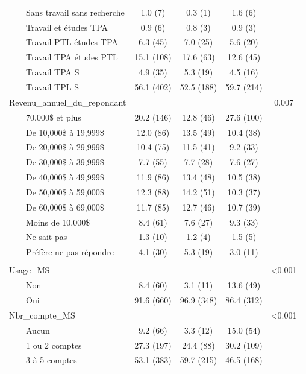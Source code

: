 \documentclass[
]{article}
\begin{document}
\begin{table}[!t]
\begin{tabular*}{\linewidth}{@{\extracolsep{\fill}}lcccc}
    Sans travail sans recherche & 1.0   (7) & 0.3   (1) & 1.6   (6) &  \\ 
    Travail et études TPA & 0.9   (6) & 0.8   (3) & 0.9   (3) &  \\ 
    Travail PTL études TPA & 6.3   (45) & 7.0   (25) & 5.6   (20) &  \\ 
    Travail TPA études PTL & 15.1   (108) & 17.6   (63) & 12.6   (45) &  \\ 
    Travail TPA S & 4.9   (35) & 5.3   (19) & 4.5   (16) &  \\ 
    Travail TPL S & 56.1   (402) & 52.5   (188) & 59.7   (214) &  \\ 
Revenu\_annuel\_du\_repondant &  &  &  & 0.007 \\ 
    70,000\$ et plus & 20.2   (146) & 12.8   (46) & 27.6   (100) &  \\ 
    De 10,000\$ à 19,999\$ & 12.0   (86) & 13.5   (49) & 10.4   (38) &  \\ 
    De 20,000\$ à 29,999\$ & 10.4   (75) & 11.5   (41) & 9.2   (33) &  \\ 
    De 30,000\$ à 39,999\$ & 7.7   (55) & 7.7   (28) & 7.6   (27) &  \\ 
    De 40,000\$ à 49,999\$ & 11.9   (86) & 13.4   (48) & 10.5   (38) &  \\ 
    De 50,000\$ à 59,000\$ & 12.3   (88) & 14.2   (51) & 10.3   (37) &  \\ 
    De 60,000\$ à 69,000\$ & 11.7   (85) & 12.7   (46) & 10.7   (39) &  \\ 
    Moins de 10,000\$ & 8.4   (61) & 7.6   (27) & 9.3   (33) &  \\ 
    Ne sait pas & 1.3   (10) & 1.2   (4) & 1.5   (5) &  \\ 
    Préfère ne pas répondre & 4.1   (30) & 5.3   (19) & 3.0   (11) &  \\ 
\midrule\addlinespace[2.5pt]
\multicolumn{5}{l}{utilisation\_medias\_sociaux} \\[2.5pt] 
\midrule\addlinespace[2.5pt]
Usage\_MS &  &  &  & <0.001 \\ 
    Non & 8.4 (60) & 3.1 (11) & 13.6 (49) &  \\ 
    Oui & 91.6 (660) & 96.9 (348) & 86.4 (312) &  \\ 
Nbr\_compte\_MS &  &  &  & <0.001 \\ 
    Aucun & 9.2 (66) & 3.3 (12) & 15.0 (54) &  \\ 
    1 ou 2 comptes & 27.3 (197) & 24.4 (88) & 30.2 (109) &  \\ 
    3 à 5 comptes & 53.1 (383) & 59.7 (215) & 46.5 (168) &  \\ 

\end{tabular*}
\end{table}
\end{document}
